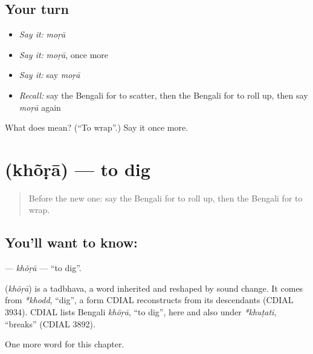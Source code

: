 \subsection*{Your turn}
\begin{itemize}
\raggedright
  \item \emph{Say it:} \emph{moṛā}
  \item \emph{Say it:} \emph{moṛā}, once more
  \item \emph{Say it:} say \emph{moṛā}
  \item \emph{Recall:} say the Bengali for to scatter, then the Bengali for to roll up, then say \emph{moṛā} again
\end{itemize}

\begin{tcolorbox}[breakable,colback=teal!4,colframe=teal!35!black,title={Before you move on}]
What does  mean? (\textquotedblleft{}To wrap\textquotedblright{}.) Say it once more.
\end{tcolorbox}
\section[\texorpdfstring{\bn{খোঁড়া} (khõṛā)}{খোঁড়া (khõṛā)}]{ (khõṛā) — to dig}

\label{lesson:BN-C242-khora}



\begin{quote}
Before the new one: say the Bengali for to roll up, then the Bengali for to wrap.
\end{quote}

\subsection*{You'll want to know: }
\textbf{} — \emph{khõṛā} — \textquotedblleft{}to dig\textquotedblright{}.

\begin{cousinweb}
\textbf{} (\emph{khõṛā}) is a tadbhava, a word inherited and reshaped by sound change. It comes from \emph{*khodd}, \textquotedblleft{}dig\textquotedblright{}, a form CDIAL reconstructs from its descendants (CDIAL 3934). CDIAL lists Bengali \emph{khõṛā}, \textquotedblleft{}to dig\textquotedblright{}, here and also under \emph{*khuṭati}, \textquotedblleft{}breaks\textquotedblright{} (CDIAL 3892).
\end{cousinweb}

\begin{grammarlens}[title={What you've built}]
One more word for this chapter.
\end{grammarlens}

